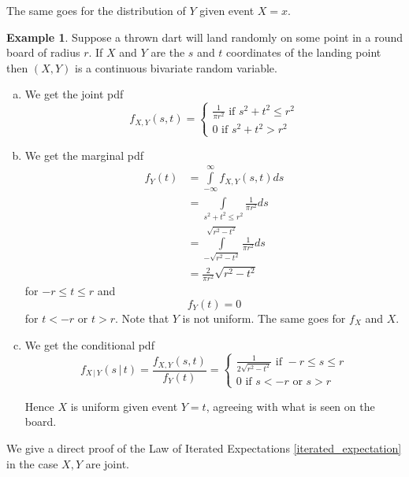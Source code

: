 \documentclass[12pt]{amsart}
\theoremstyle{definition}
\newtheorem{example}[theorem]{Example}
\begin{document}
The same goes for the distribution of $Y$ given event $X = x$.

\begin{example} \label{dartboard} Suppose a thrown dart will land randomly on some point in a round board of radius $r$. If $X$ and $Y$ are the $s$ and $t$ coordinates of the landing point then $(X, Y)$ is a continuous bivariate random variable.
\begin{enumerate}[a.]
\item We get the joint pdf
$$f_{X, Y}(s, t) = \begin{cases} \frac{1}{\pi r^2} \text{ if } s^2 + t^2 \leq r^2 \\ 0 \text{ if } s^2 + t^2 > r^2 \end{cases}$$
\item We get the marginal pdf
\begin{align*}
f_Y(t) & = \int\limits_{-\infty}^{\infty} f_{X, Y}(s, t)ds \\
 & = \int\limits_{s^2 + t^2 \leq r^2} \frac{1}{\pi r^2} ds \\
 & = \int\limits_{-\sqrt{r^2 - t^2}}^{\sqrt{r^2 - t^2}} \frac{1}{\pi r^2} ds \\
 & = \frac{2}{\pi r^2} \sqrt{r^2 - t^2}
\end{align*}
for $-r \leq t  \leq r$ and
$$f_Y(t) = 0$$
for $t < -r$ or $t > r$. Note that $Y$ is not uniform. The same goes for $f_X$ and $X$.
\item We get the conditional pdf
$$f_{X \,|\, Y}(s \,|\, t) = \frac{f_{X, Y}(s, t)}{f_Y(t)} = \begin{cases} \frac{1}{2\sqrt{r^2 - t^2}} \text{ if } -r \leq s \leq r \\ 0 \text{ if } s < -r \text{ or } s > r \end{cases}$$

Hence $X$ is uniform given event $Y = t$, agreeing with what is seen on the board.
\end{enumerate}
\end{example}

We give a direct proof of the Law of Iterated Expectations \ref{iterated_expectation} in the case $X, Y$ are joint.
\end{document}

